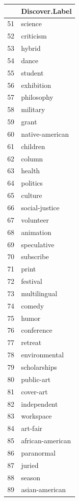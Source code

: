 \documentclass[]{report}   %
\begin{document}
\begin{minipage}{0.24\textwidth}

\begin{tabular}{rl}
  \hline
 & Discover.Label \\ 
  \hline
  51 & science \\ 
  52 & criticism \\ 
  53 & hybrid \\ 
  54 & dance \\ 
  55 & student \\ 
  56 & exhibition \\ 
  57 & philosophy \\ 
  58 & military \\ 
  59 & grant \\ 
  60 & native-american \\ 
  61 & children \\ 
  62 & column \\ 
  63 & health \\ 
  64 & politics \\ 
  65 & culture \\ 
  66 & social-justice \\ 
  67 & volunteer \\ 
  68 & animation \\ 
  69 & speculative \\ 
  70 & subscribe \\ 
  71 & print \\ 
  72 & festival \\ 
  73 & multilingual \\ 
  74 & comedy \\ 
  75 & humor \\ 
  76 & conference \\ 
  77 & retreat \\ 
  78 & environmental \\ 
  79 & scholarships \\ 
  80 & public-art \\ 
  81 & cover-art \\ 
  82 & independent \\ 
  83 & workspace \\ 
  84 & art-fair \\ 
  85 & african-american \\ 
  86 & paranormal \\ 
  87 & juried \\ 
  88 & season \\ 
  89 & asian-american \\ 

\end{tabular}
\end{minipage}
\end{document}
